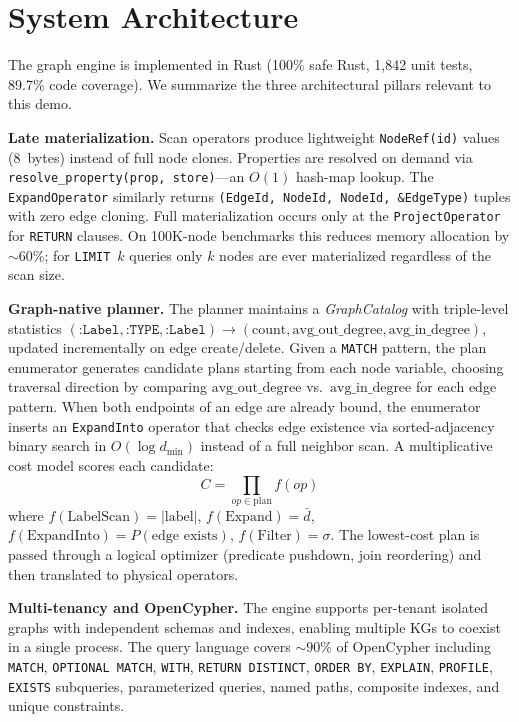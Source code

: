 \documentclass[sigconf]{acmart}
\begin{document}
\section{System Architecture}\label{sec:engine}

The graph engine is implemented in Rust (100\% safe Rust, 1,842 unit
tests, 89.7\% code coverage).  We summarize the three architectural
pillars relevant to this demo.

\smallskip\noindent\textbf{Late materialization.}
Scan operators produce lightweight \texttt{NodeRef(id)} values (8~bytes)
instead of full node clones.  Properties are resolved on demand via
\texttt{resolve\_property(prop, store)}---an $O(1)$ hash-map lookup.
The \texttt{ExpandOperator} similarly returns
\texttt{(EdgeId, NodeId, NodeId, \&EdgeType)} tuples with zero edge
cloning.  Full materialization occurs only at the \texttt{ProjectOperator}
for \texttt{RETURN} clauses.  On 100K-node benchmarks this reduces memory
allocation by ${\sim}60\%$; for \texttt{LIMIT}~$k$ queries only $k$ nodes
are ever materialized regardless of the scan size.

\smallskip\noindent\textbf{Graph-native planner.}
The planner maintains a \emph{GraphCatalog} with triple-level statistics
$(\texttt{:Label}, \texttt{:TYPE}, \texttt{:Label}) \to
(\text{count}, \text{avg\_out\_degree}, \text{avg\_in\_degree})$,
updated incrementally on edge create/delete.  Given a \texttt{MATCH}
pattern, the plan enumerator generates candidate plans starting from
each node variable, choosing traversal direction by comparing
$\text{avg\_out\_degree}$ vs.\ $\text{avg\_in\_degree}$ for each edge
pattern.  When both endpoints of an edge are already bound, the
enumerator inserts an \texttt{ExpandInto} operator that checks
edge existence via sorted-adjacency binary search in
$O(\log d_{\min})$ instead of a full neighbor scan.
A multiplicative cost model scores each candidate:
\[
  C = \prod_{op \in \text{plan}} f(op)
\]
where $f(\text{LabelScan}) = |\text{label}|$,
$f(\text{Expand}) = \bar{d}$,
$f(\text{ExpandInto}) = P(\text{edge exists})$,
$f(\text{Filter}) = \sigma$.
The lowest-cost plan is passed through a logical optimizer
(predicate pushdown, join reordering) and then translated to
physical operators.

\smallskip\noindent\textbf{Multi-tenancy and OpenCypher.}
The engine supports per-tenant isolated graphs with independent
schemas and indexes, enabling multiple KGs to coexist in a single
process.  The query language covers ${\sim}90\%$ of OpenCypher
including \texttt{MATCH}, \texttt{OPTIONAL MATCH}, \texttt{WITH},
\texttt{RETURN DISTINCT}, \texttt{ORDER BY}, \texttt{EXPLAIN},
\texttt{PROFILE}, \texttt{EXISTS} subqueries, parameterized queries,
named paths, composite indexes, and unique constraints.
\end{document}
